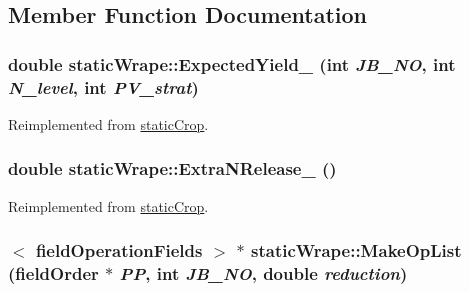 \subsection{Member Function Documentation}
\hypertarget{classstatic_wrape_a50f665a89f57eaafd331b4b47f453b94}{
\subsubsection[{ExpectedYield\_\-}]{\setlength{\rightskip}{0pt plus 5cm}double staticWrape::ExpectedYield\_\- (int {\em JB\_\-NO}, \/  int {\em N\_\-level}, \/  int {\em PV\_\-strat})}}
\label{classstatic_wrape_a50f665a89f57eaafd331b4b47f453b94}


Reimplemented from \hyperlink{classstatic_crop_ab7b9a8ecb31b10c4dcf44f13000e2f8c}{staticCrop}.\hypertarget{classstatic_wrape_a104ee6695eb00810ebffd99b45c4bdd0}{
\subsubsection[{ExtraNRelease\_\-}]{\setlength{\rightskip}{0pt plus 5cm}double staticWrape::ExtraNRelease\_\- ()}}
\label{classstatic_wrape_a104ee6695eb00810ebffd99b45c4bdd0}


Reimplemented from \hyperlink{classstatic_crop_afe0cb8a7831afa941a37338f05227d67}{staticCrop}.\hypertarget{classstatic_wrape_a5d54894462f4539795ccfaaf89296327}{
\subsubsection[{MakeOpList}]{$<$ {\bf fieldOperationFields} $>$ $\ast$ staticWrape::MakeOpList ({\bf fieldOrder} $\ast$ {\em PP}, \/  int {\em JB\_\-NO}, \/  double {\em reduction})}}
\label{classstatic_wrape_a5d54894462f4539795ccfaaf89296327}


